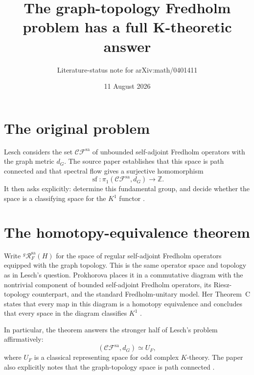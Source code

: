 \documentclass[11pt]{article}
\title{The graph-topology Fredholm problem has a full K-theoretic answer}
\author{Literature-status note for arXiv:math/0401411}
\date{11 August 2026}
\begin{document}
\maketitle

\begin{center}
\end{center}

\section*{The original problem}

Lesch considers the set $\mathcal{CF}^{\mathrm{sa}}$ of unbounded
self-adjoint Fredholm operators with the graph metric $d_G$.  The source
paper establishes that this space is path connected and that spectral flow
gives a surjective homomorphism
\[
  \operatorname{sf}:\pi_1(\mathcal{CF}^{\mathrm{sa}},d_G)\longrightarrow
  \mathbb Z.
\]
It then asks explicitly: determine this fundamental group, and decide whether
the space is a classifying space for the $K^1$ functor
\cite[p.~3]{source}.

\section*{The homotopy-equivalence theorem}

Write ${}^{g}\!\mathcal R_F^{\mathrm{sa}}(H)$ for the space of regular
self-adjoint Fredholm operators equipped with the graph topology.  This is
the same operator space and topology as in Lesch's question.  Prokhorova
places it in a commutative diagram with the nontrivial component of bounded
self-adjoint Fredholm operators, its Riesz-topology counterpart, and the
standard Fredholm-unitary model.  Her Theorem~C states that every map in this
diagram is a homotopy equivalence and concludes that every space in the
diagram classifies $K^1$ \cite[pp.~5--6, Theorem~C]{answer}.

In particular, the theorem answers the stronger half of Lesch's problem
affirmatively:
\[
  (\mathcal{CF}^{\mathrm{sa}},d_G)\simeq U_F,
\]
where $U_F$ is a classical representing space for odd complex $K$-theory.
The paper also explicitly notes that the graph-topology space is path
connected \cite[p.~5]{answer}.
\end{document}
